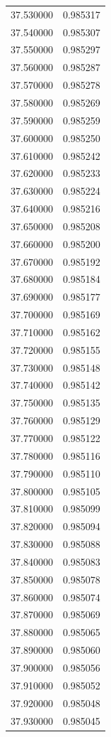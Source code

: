 \begin{tabular}{rr}
37.530000 & 0.985317 \\
37.540000 & 0.985307 \\
37.550000 & 0.985297 \\
37.560000 & 0.985287 \\
37.570000 & 0.985278 \\
37.580000 & 0.985269 \\
37.590000 & 0.985259 \\
37.600000 & 0.985250 \\
37.610000 & 0.985242 \\
37.620000 & 0.985233 \\
37.630000 & 0.985224 \\
37.640000 & 0.985216 \\
37.650000 & 0.985208 \\
37.660000 & 0.985200 \\
37.670000 & 0.985192 \\
37.680000 & 0.985184 \\
37.690000 & 0.985177 \\
37.700000 & 0.985169 \\
37.710000 & 0.985162 \\
37.720000 & 0.985155 \\
37.730000 & 0.985148 \\
37.740000 & 0.985142 \\
37.750000 & 0.985135 \\
37.760000 & 0.985129 \\
37.770000 & 0.985122 \\
37.780000 & 0.985116 \\
37.790000 & 0.985110 \\
37.800000 & 0.985105 \\
37.810000 & 0.985099 \\
37.820000 & 0.985094 \\
37.830000 & 0.985088 \\
37.840000 & 0.985083 \\
37.850000 & 0.985078 \\
37.860000 & 0.985074 \\
37.870000 & 0.985069 \\
37.880000 & 0.985065 \\
37.890000 & 0.985060 \\
37.900000 & 0.985056 \\
37.910000 & 0.985052 \\
37.920000 & 0.985048 \\
37.930000 & 0.985045 \\

\end{tabular}
